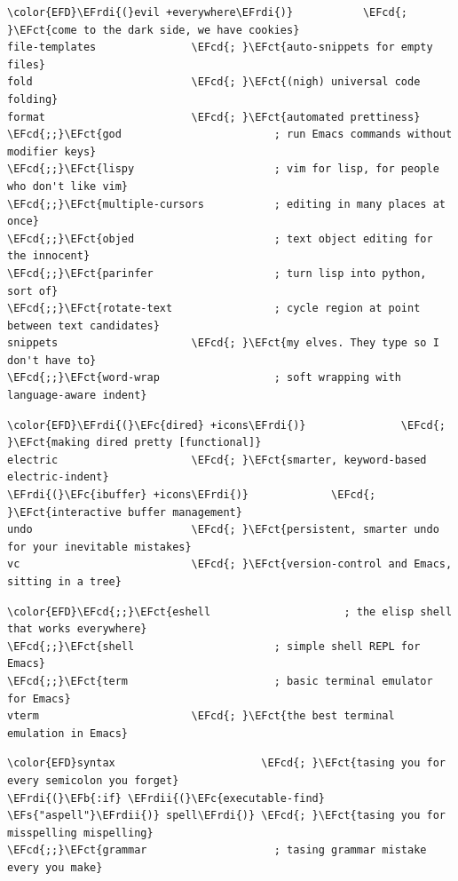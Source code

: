 \documentclass{scrartcl}
\newcommand{\EFs}[1]{\textcolor{EFs}{#1}} %
\newcommand{\EFb}[1]{\textcolor{EFb}{#1}} %
\newcommand{\EFct}[1]{\textcolor{EFct}{#1}} %
\newcommand{\EFc}[1]{\textcolor{EFc}{#1}} %
\newcommand{\EFcd}[1]{\textcolor{EFcd}{#1}} %
\newcommand{\EFrdi}[1]{\textcolor{EFrdi}{#1}} %
\newcommand{\EFrdii}[1]{\textcolor{EFrdii}{#1}} %
\begin{document}
\begin{enumerate}
\begin{Code}
\begin{Verbatim}[]
\color{EFD}\EFrdi{(}evil +everywhere\EFrdi{)}           \EFcd{; }\EFct{come to the dark side, we have cookies}
file-templates               \EFcd{; }\EFct{auto-snippets for empty files}
fold                         \EFcd{; }\EFct{(nigh) universal code folding}
format                       \EFcd{; }\EFct{automated prettiness}
\EFcd{;;}\EFct{god                        ; run Emacs commands without modifier keys}
\EFcd{;;}\EFct{lispy                      ; vim for lisp, for people who don't like vim}
\EFcd{;;}\EFct{multiple-cursors           ; editing in many places at once}
\EFcd{;;}\EFct{objed                      ; text object editing for the innocent}
\EFcd{;;}\EFct{parinfer                   ; turn lisp into python, sort of}
\EFcd{;;}\EFct{rotate-text                ; cycle region at point between text candidates}
snippets                     \EFcd{; }\EFct{my elves. They type so I don't have to}
\EFcd{;;}\EFct{word-wrap                  ; soft wrapping with language-aware indent}
\end{Verbatim}
\end{Code}

\begin{Code}
\begin{Verbatim}[]
\color{EFD}\EFrdi{(}\EFc{dired} +icons\EFrdi{)}               \EFcd{; }\EFct{making dired pretty [functional]}
electric                     \EFcd{; }\EFct{smarter, keyword-based electric-indent}
\EFrdi{(}\EFc{ibuffer} +icons\EFrdi{)}             \EFcd{; }\EFct{interactive buffer management}
undo                         \EFcd{; }\EFct{persistent, smarter undo for your inevitable mistakes}
vc                           \EFcd{; }\EFct{version-control and Emacs, sitting in a tree}
\end{Verbatim}
\end{Code}

\begin{Code}
\begin{Verbatim}[]
\color{EFD}\EFcd{;;}\EFct{eshell                     ; the elisp shell that works everywhere}
\EFcd{;;}\EFct{shell                      ; simple shell REPL for Emacs}
\EFcd{;;}\EFct{term                       ; basic terminal emulator for Emacs}
vterm                        \EFcd{; }\EFct{the best terminal emulation in Emacs}
\end{Verbatim}
\end{Code}

\begin{Code}
\begin{Verbatim}[]
\color{EFD}syntax                       \EFcd{; }\EFct{tasing you for every semicolon you forget}
\EFrdi{(}\EFb{:if} \EFrdii{(}\EFc{executable-find} \EFs{"aspell"}\EFrdii{)} spell\EFrdi{)} \EFcd{; }\EFct{tasing you for misspelling mispelling}
\EFcd{;;}\EFct{grammar                    ; tasing grammar mistake every you make}
\end{Verbatim}
\end{Code}


\end{enumerate}
\end{document}
